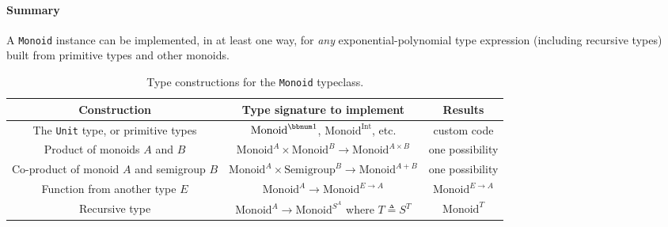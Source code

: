 \paragraph{Summary}

A \lstinline!Monoid! instance can be implemented, in at least one
way, for \emph{any} exponential-polynomial type expression (including
recursive types) built from primitive types and other monoids.

\begin{comment}
There exist other type constructions for monoids that work in special
cases. One example is the ``twisted product'' $P\times Q$ where
$P$ and $Q$ are monoids and additionally $P$ has an \textbf{action
on} $Q$. The ``action'' is a function $\alpha:P\rightarrow Q\rightarrow Q$
obeying the special composition law, $\alpha(p_{1})\bef\alpha(p_{2})=\alpha(p_{1}\oplus p_{2})$.
The monoidal operation is defined by
\[
(p_{1}\times q_{1})\oplus(p_{2}\times q_{2})=(p_{1}\oplus p_{2})\times(\alpha(p_{2})(q_{1})\oplus q_{2})\quad.
\]
 Examples of this construction are twisted products $\left(A\rightarrow A\right)\times A$
and $\bbnum 2\times\left(\bbnum 1+A\right)$.
\end{comment}

\begin{table}
\begin{centering}
\begin{tabular}{|c|c|c|}
\hline 
\textbf{\footnotesize{}Construction} & \textbf{\footnotesize{}Type signature to implement} & \textbf{\footnotesize{}Results}\tabularnewline
\hline 
\hline 
{\footnotesize{}The }\lstinline!Unit!{\footnotesize{} type, or primitive
types} & {\footnotesize{}$\text{Monoid}^{\bbnum 1}$, $\text{Monoid}^{\text{Int}}$,
etc.} & {\footnotesize{}custom code}\tabularnewline
\hline 
{\footnotesize{}Product of monoids $A$ and $B$} & {\footnotesize{}$\text{Monoid}^{A}\times\text{Monoid}^{B}\rightarrow\text{Monoid}^{A\times B}$} & {\footnotesize{}one possibility}\tabularnewline
\hline 
{\footnotesize{}Co-product of monoid $A$ and semigroup $B$} & {\footnotesize{}$\text{Monoid}^{A}\times\text{Semigroup}^{B}\rightarrow\text{Monoid}^{A+B}$} & {\footnotesize{}one possibility}\tabularnewline
\hline 
{\footnotesize{}Function from another type $E$} & {\footnotesize{}$\text{Monoid}^{A}\rightarrow\text{Monoid}^{E\rightarrow A}$} & {\footnotesize{}$\text{Monoid}^{E\rightarrow A}$}\tabularnewline
\hline 
{\footnotesize{}Recursive type} & {\footnotesize{}$\text{Monoid}^{A}\rightarrow\text{Monoid}^{S^{A}}$
where $T\triangleq S^{T}$} & {\footnotesize{}$\text{Monoid}^{T}$}\tabularnewline
\hline 
\end{tabular}
\par\end{centering}
\caption{Type constructions for the \lstinline!Monoid! typeclass.\label{tab:Type-constructions-for-monoid}}
\end{table}



